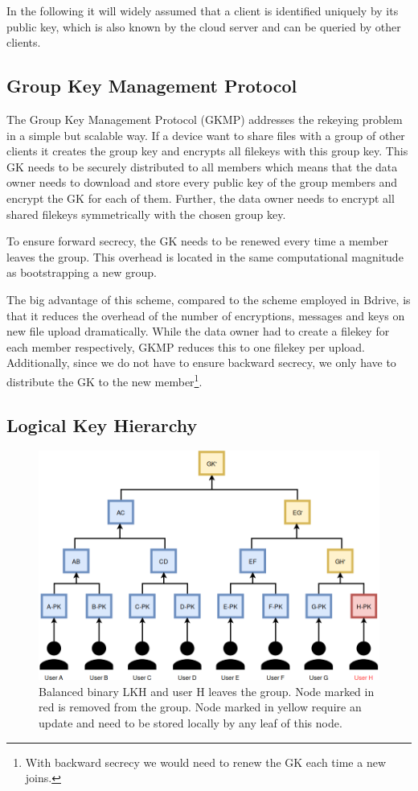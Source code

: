 In the following it will widely assumed that a client is identified uniquely by its public key, which is also known by the cloud server and can be queried by other clients. 

\subsection{Group Key Management Protocol}
The Group Key Management Protocol (\ac{GKMP})\cite{harney1997group} addresses the rekeying problem in a simple but scalable way. If a device want to share files with a group of other clients it creates the group key and encrypts all filekeys with this group key. This \ac{GK} needs to be securely distributed to all members which means that the data owner needs to download and store every public key of the group members and encrypt the \ac{GK} for each of them. Further, the data owner needs to encrypt all shared filekeys symmetrically with the chosen group key. 

To ensure forward secrecy, the \ac{GK} needs to be renewed every time a member leaves the group. This overhead is located in the same computational magnitude as bootstrapping a new group. 

The big advantage of this scheme, compared to the scheme employed in Bdrive, is that it reduces the overhead of the number of encryptions, messages and keys on new file upload dramatically. While the data owner had to create a filekey for each member respectively, \ac{GKMP} reduces this to one filekey per upload. Additionally, since we do not have to ensure backward secrecy, we only have to distribute the \ac{GK} to the new member\footnote{With backward secrecy we would need to renew the GK each time a new joins.}.

\subsection{Logical Key Hierarchy}
\begin{figure}[!ht]
\centering
    \includegraphics[width=0.8\linewidth]{img/LKH.png}
    \caption{Balanced binary \ac{LKH} and user H leaves the group. Node marked in red is removed from the group. Node marked in yellow require an update and need to be stored locally by any leaf of this node. }
    \label{fig:lkh}
\end{figure}

